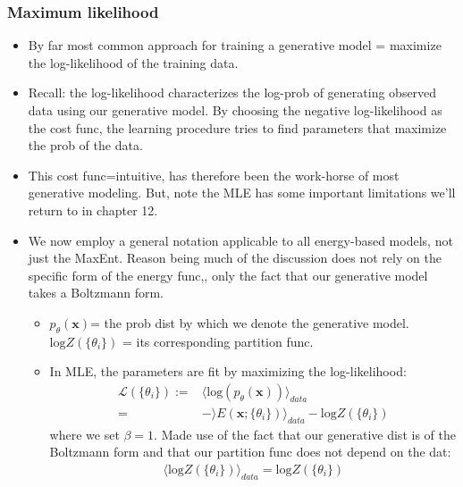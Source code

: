 \documentclass[norsk,a4paper,11pt]{article}
\begin{document}
\subsubsection{Maximum likelihood}
\begin{itemize}
	\item By far most common approach for training a generative model = maximize the log-likelihood of the training data.
	\item Recall: the log-likelihood characterizes the log-prob of generating observed data using our generative model. By choosing the negative log-likelihood as the cost func, the learning procedure tries to find parameters that maximize the prob of the data. 
	\item This cost func=intuitive, has therefore been the work-horse of most generative modeling. But, note the MLE has some important limitations we'll return to in chapter 12.
	\item We now employ a general notation applicable to all energy-based models, not just the MaxEnt. Reason being much of the discussion does not rely on the specific form of the energy func,, only the fact that our generative model takes a Boltzmann form. 
	\begin{itemize}
		\item $p_\theta(\bm{x})$= the prob dist by which we denote the generative model. $\text{log} Z(\{ \theta_i \})$ = its corresponding partition func.
		\item In MLE, the parameters are fit by maximizing the log-likelihood:
		\begin{align}
			\mathcal{L}(\{ \theta_i \}) :=& \langle \text{log} (p_\theta (\bm{x})) \rangle_{data} \\
			=& - \rangle E(\bm{x}; \{ \theta_i \}) \rangle_{data} - \text{log} Z (\{ \theta_i \})
		\end{align}
		where we set $\beta=1$. Made use of the fact that our generative dist is of the Boltzmann form and that our partition func does not depend on the dat:
		\begin{align}
			\langle \text{log} Z(\{ \theta_i \}) \rangle_{data} = \text{log} Z (\{ \theta_i \})
		\end{align}
	\end{itemize}
\end{itemize}
\end{document}
